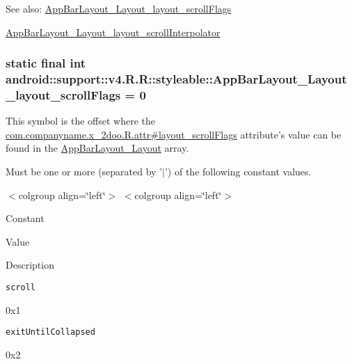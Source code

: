 \begin{Desc}
\item[See also:]\hyperlink{classandroid_1_1support_1_1v4_1_1_r_1_1styleable_77c239ef8452106864e05fd3dabb1747}{AppBarLayout\_\-Layout\_\-layout\_\-scrollFlags} 

\hyperlink{classandroid_1_1support_1_1v4_1_1_r_1_1styleable_ffbd29e3aa103fef348ea2fe39dfda75}{AppBarLayout\_\-Layout\_\-layout\_\-scrollInterpolator} \end{Desc}
\hypertarget{classandroid_1_1support_1_1v4_1_1_r_1_1styleable_77c239ef8452106864e05fd3dabb1747}{
\subsubsection[{AppBarLayout\_\-Layout\_\-layout\_\-scrollFlags}]{\setlength{\rightskip}{0pt plus 5cm}static final int android::support::v4.R.R::styleable::AppBarLayout\_\-Layout\_\-layout\_\-scrollFlags = 0}}
\label{classandroid_1_1support_1_1v4_1_1_r_1_1styleable_77c239ef8452106864e05fd3dabb1747}


This symbol is the offset where the \hyperlink{classcom_1_1companyname_1_1x__2doo_1_1_r_1_1attr_0ecb7a4eb79d00ad102fb68dd560654f}{com.companyname.x\_\-2doo.R.attr\#layout\_\-scrollFlags} attribute's value can be found in the \hyperlink{classandroid_1_1support_1_1v4_1_1_r_1_1styleable_3e73f9e75520cf590d9355042c5d4099}{AppBarLayout\_\-Layout} array.

Must be one or more (separated by '$|$') of the following constant values. \begin{TabularC}{0}
\hline
\end{TabularC}
$<$colgroup align=\char`\"{}left\char`\"{}$>$ $<$colgroup align=\char`\"{}left\char`\"{}$>$ 

Constant

Value

Description 

{\tt scroll}

0x1

{\tt exitUntilCollapsed}

0x2

